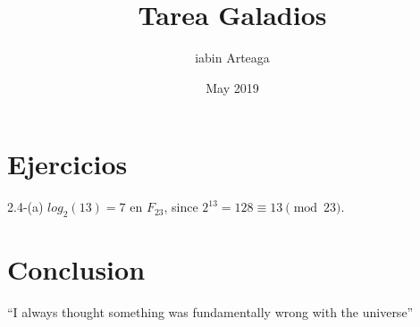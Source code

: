 \documentclass{article}
\title{Tarea Galadios}
\author{iabin Arteaga}
\date{May 2019}
\begin{document}
\maketitle

\section{Ejercicios}
2.4-(a) $log_2(13) = 7$ en $F_{23}$, since $2^{13} = 128 \equiv 13 \pmod{23}$.



\section{Conclusion}
``I always thought something was fundamentally wrong with the universe'' \citep{adams1995hitchhiker}



\end{document}
